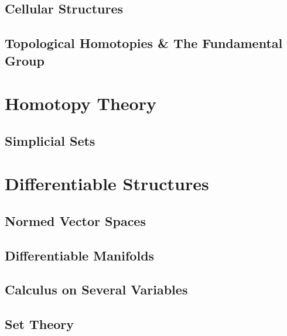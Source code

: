 

\chapter{Cellular Structures}



\chapter{Topological Homotopies \& The Fundamental Group}



\part{Homotopy Theory}

\chapter{Simplicial Sets}



\part{Differentiable Structures}


\chapter{Normed Vector Spaces}



\chapter{Differentiable Manifolds}




\appendix

\chapter{Calculus on Several Variables}







\chapter{Set Theory}



\backmatter

\printbibliography


